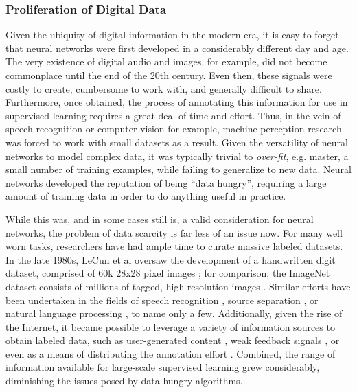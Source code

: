 \subsubsection{Proliferation of Digital Data}
\label{subsec:perceptrons}

Given the ubiquity of digital information in the modern era, it is easy to forget that neural networks were first developed in a considerably different day and age.
The very existence of digital audio and images, for example, did not become commonplace until the end of the 20th century.
Even then, these signals were costly to create, cumbersome to work with, and generally difficult to share.
Furthermore, once obtained, the process of annotating this information for use in supervised learning requires a great deal of time and effort.
Thus, in the vein of speech recognition or computer vision for example, machine perception research was forced to work with small datasets as a result.
Given the versatility of neural networks to model complex data, it was typically trivial to \emph{over-fit}, e.g. master, a small number of training examples, while failing to generalize to new data.
Neural networks developed the reputation of being ``data hungry'', requiring a large amount of training data in order to do anything useful in practice.

While this was, and in some cases still is, a valid consideration for neural networks, the problem of data scarcity is far less of an issue now.
For many well worn tasks, researchers have had ample time to curate massive labeled datasets.
In the late 1980s, LeCun et al oversaw the development of a handwritten digit dataset, comprised of 60k 28x28 pixel images \cite{};
for comparison, the ImageNet dataset consists of millions of tagged, high resolution images \cite{}.
Similar efforts have been undertaken in the fields of speech recognition \cite{TIMIT}, source separation \cite{charm, MedleyDB}, or natural language processing \cite{WallStreet, Wikipedia}, to name only a few.
Additionally, given the rise of the Internet, it became possible to leverage a variety of information sources to obtain labeled data, such as user-generated content \cite{last.fm}, weak feedback signals \cite{netflix}, or even as a means of distributing the annotation effort \cite{Captcha, CitizenScience}.
Combined, the range of information available for large-scale supervised learning grew considerably, diminishing the issues posed by data-hungry algorithms.

